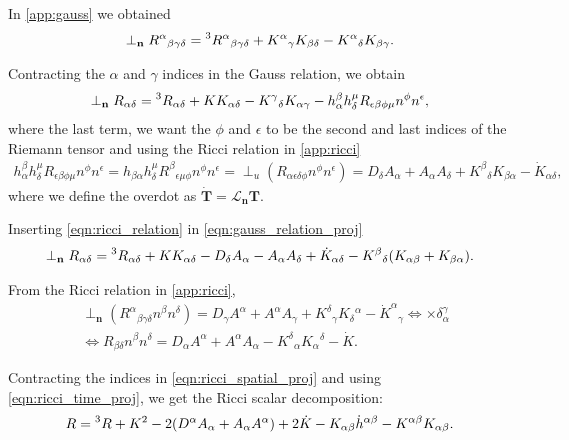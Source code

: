 In \cref{app:gauss} we obtained
\begin{align}
    \perp_{\mathbf{n}} R^\alpha{}_{\beta\gamma\delta} = \prescript{3}{}R^\alpha{}_{\beta\gamma\delta}+K^\alpha{}_\gamma K_{\beta\delta}-K^\alpha{}_\delta K_{\beta\gamma}.
\end{align}

Contracting the $\alpha$ and $\gamma$ indices in the Gauss relation, we obtain
\begin{align}
    \perp_{\mathbf{n}} R_{\alpha\delta}  = \prescript{3}{}R_{\alpha\delta}+KK_{\alpha\delta}-K^\gamma{}_\delta K_{\alpha\gamma} - h^\beta_\alpha h^\mu_\delta R_{\epsilon\beta\phi\mu} n^\phi n^\epsilon,
    \label{eqn:gauss_relation_proj}
\end{align}
where the last term, we want the $\phi$ and $\epsilon$ to be the second and last indices of the Riemann tensor and using the Ricci relation in \cref{app:ricci}
\begin{align}
    h^\beta_\alpha h^\mu_\delta R_{\epsilon\beta\phi\mu} n^\phi n^\epsilon= h_{\beta\alpha} h^\mu_\delta R^\beta{}_{\epsilon\mu\phi} n^\phi n^\epsilon = \perp_u(R_{\alpha\epsilon\delta\phi} n^\phi n^\epsilon) = D_\delta A_\alpha + A_\alpha A_\delta + K^\beta{}_\delta K_{\beta\alpha} - \dot{K}_{\alpha\delta},
    \label{eqn:ricci_relation}
\end{align}
where we define the overdot as $\dot{\mathbf{T}}=\mathcal{L}_{\mathbf{n}}\mathbf{T}$.

Inserting \cref{eqn:ricci_relation} in \cref{eqn:gauss_relation_proj}
\begin{align}
    \perp_{\mathbf{n}} R_{\alpha\delta}=\prescript{3}{}R_{\alpha\delta}+K K_{\alpha\delta}- D_\delta A_\alpha - A_\alpha A_\delta + \dot{K}_{\alpha\delta} -K^\beta{}_\delta (K_{\alpha\beta}+K_{\beta\alpha}).
    \label{eqn:ricci_spatial_proj}
\end{align}


From the Ricci relation in \cref{app:ricci},
\begin{align}
    &\perp_{\mathbf{n}} (R^\alpha{}_{\beta\gamma\delta} n^\beta n^\delta) = D_\gamma A^\alpha + A^\alpha A_\gamma + K^\delta{}_\gamma K_\delta{}^\alpha - \dot{K}^\alpha{}_\gamma \Leftrightarrow \times \delta^\gamma_\alpha\\
    &\Leftrightarrow  R_{\beta\delta}n^\beta n^\delta = D_\alpha A^\alpha + A^\alpha A_\alpha - K^\delta{}_\alpha K_\alpha{}^\delta -\dot{K}.
    \label{eqn:ricci_time_proj}
\end{align}


Contracting the indices in \cref{eqn:ricci_spatial_proj} and using \cref{eqn:ricci_time_proj}, we get the Ricci scalar decomposition:
\begin{align}
    R = \prescript{3}{}R+K^2 - 2(D^\alpha A_\alpha +  A_\alpha A^\alpha) + 2\dot{K}-K_{\alpha\beta}\dot{h}^{\alpha\beta}-K^{\alpha\beta}K_{\alpha\beta}.
    \label{eqn:ricci_scalar_decomp}
\end{align}





